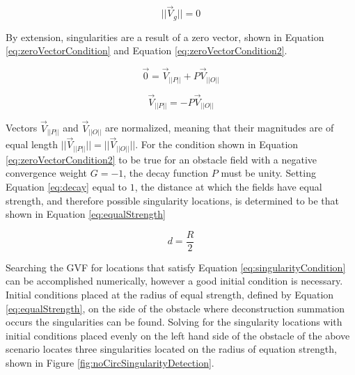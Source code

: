 \documentclass[numbered,pdftex]{ohio-etd}
\begin{document}
\begin{equation}
\label{eq:singularityCondition}
||\overrightarrow{V}_g || = 0
\end{equation}

\noindent
By extension, singularities are a result of a zero vector, shown in Equation \ref{eq:zeroVectorCondition} and Equation \ref{eq:zeroVectorCondition2}.



\begin{equation}
\label{eq:zeroVectorCondition}
\overrightarrow{0} = \overrightarrow{V}_{||P||} +P\overrightarrow{V}_{||O||}
\end{equation}

\begin{equation}
\label{eq:zeroVectorCondition2}
\overrightarrow{V}_{||P||}=-P\overrightarrow{V}_{||O||}
\end{equation}

Vectors $\overrightarrow{V}_{||P||}$ and $\overrightarrow{V}_{||O||}$ are normalized, meaning that their magnitudes are of equal length $||\overrightarrow{V}_{||P||}||=||\overrightarrow{V}_{||O||}||$. For the condition shown in Equation \ref{eq:zeroVectorCondition2} to be true for an obstacle field with a negative convergence weight $G=-1$, the decay function $P$ must be unity. Setting Equation \ref{eq:decay} equal to $1$, the distance at which the fields have equal strength, and therefore possible singularity locations, is determined to be that shown in Equation \ref{eq:equalStrength}

\begin{equation}
\label{eq:equalStrength}
d = \frac{R}{2}
\end{equation}

Searching the GVF for locations that satisfy Equation \ref{eq:singularityCondition} can be accomplished numerically, however a good initial condition is necessary. Initial conditions placed at the radius of equal strength, defined by Equation \ref{eq:equalStrength}, on the side of the obstacle where deconstruction summation occurs the singularities can be found. Solving for the singularity locations with initial conditions placed evenly on the left hand side of the obstacle of the above scenario locates three singularities located on the radius of equation strength, shown in Figure \ref{fig:noCircSingularityDetection}.
\end{document}
